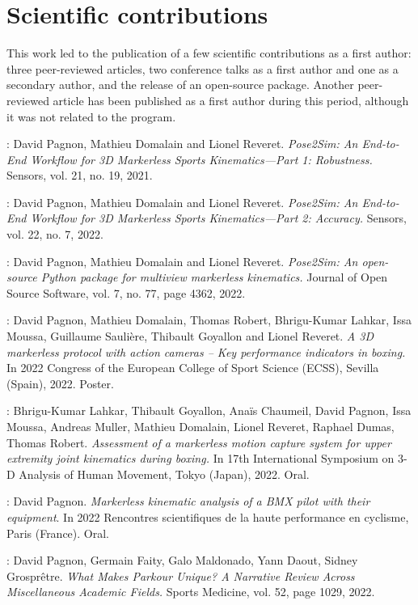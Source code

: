\newpage
\section*{Scientific contributions}

This work led to the publication of a few scientific contributions as a first author: three peer-reviewed articles, two conference talks as a first author and one as a secondary author, and the release of an open-source package.
Another peer-reviewed article has been published as a first author during this period, although it was not related to the program.

\noindent\cite{Pagnon2021}: David Pagnon, Mathieu Domalain and Lionel Reveret. \textit{Pose2Sim: An
End-to-End Workflow for 3D Markerless Sports Kinematics—Part 1:
Robustness.} Sensors, vol. 21, no. 19, 2021.

\noindent\cite{Pagnon2022a}: David Pagnon, Mathieu Domalain and Lionel Reveret. \textit{Pose2Sim: An
End-to-End Workflow for 3D Markerless Sports Kinematics—Part 2:
Accuracy.} Sensors, vol. 22, no. 7, 2022.

\noindent\cite{Pagnon2022b}: David Pagnon, Mathieu Domalain and Lionel Reveret. \textit{Pose2Sim:
An open-source Python package for multiview markerless kinematics.}
Journal of Open Source Software, vol. 7, no. 77, page 4362, 2022.

\noindent\cite{Pagnon2022c}: 
David Pagnon, Mathieu Domalain, Thomas Robert, Bhrigu-Kumar Lahkar, Issa Moussa, Guillaume Saulière, Thibault Goyallon and Lionel Reveret. \textit{A 3D markerless protocol with action cameras – Key performance indicators in boxing.} In 2022 Congress of the European College of Sport Science (ECSS), Sevilla (Spain), 2022. Poster.

\noindent\cite{Lahkar2022a}: 
Bhrigu-Kumar Lahkar, Thibault Goyallon, Anaïs Chaumeil, David Pagnon, Issa Moussa, Andreas Muller, Mathieu Domalain, Lionel Reveret, Raphael Dumas, Thomas Robert. \textit{Assessment of a markerless motion capture system for upper extremity joint kinematics during boxing.} In 17th International Symposium on 3-D Analysis of Human Movement, Tokyo (Japan), 2022. Oral.


\noindent\cite{Pagnon2022e}: 
David Pagnon. \textit{Markerless kinematic analysis of a BMX pilot with their equipment}. In 2022 Rencontres scientifiques de la haute performance en cyclisme, Paris (France). Oral.

\noindent\cite{Pagnon2022d}: 
David Pagnon, Germain Faity, Galo Maldonado, Yann Daout, Sidney Grosprêtre. \textit{What Makes Parkour Unique? A Narrative Review Across Miscellaneous Academic Fields.} Sports Medicine, vol. 52, page 1029, 2022.
